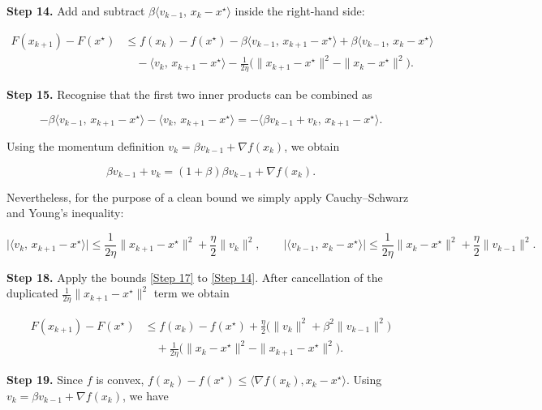 \documentclass{article}
\newcommand{\grad}{\nabla}
\begin{document}
\medskip
\noindent\textbf{Step 14.}  Add and subtract $\beta\langle v_{k-1},\,x_{k}-x^{\star}\rangle$ inside the right‑hand side:

\[
\begin{aligned}
F(x_{k+1})-F(x^{\star})
&\le f(x_{k})-f(x^{\star})
   -\beta\langle v_{k-1},\,x_{k+1}-x^{\star}\rangle
   +\beta\langle v_{k-1},\,x_{k}-x^{\star}\rangle \\
&\quad -\langle v_{k},\,x_{k+1}-x^{\star}\rangle
   -\frac{1}{2\eta}\big(\|x_{k+1}-x^{\star}\|^{2}
                     -\|x_{k}-x^{\star}\|^{2}\big).
\end{aligned}
\tag{Step 14}
\]

\medskip
\noindent\textbf{Step 15.}  Recognise that the first two inner products can be combined as  

\[
-\beta\langle v_{k-1},\,x_{k+1}-x^{\star}\rangle
   -\langle v_{k},\,x_{k+1}-x^{\star}\rangle
= -\langle \beta v_{k-1}+v_{k},\,x_{k+1}-x^{\star}\rangle .
\tag{Step 15}
\]

Using the momentum definition $v_{k}= \beta v_{k-1}+ \grad f(x_{k})$, we obtain  

\[
\beta v_{k-1}+v_{k}= (1+\beta)\beta v_{k-1}+ \grad f(x_{k}).
\tag{Step 16}
\]

Nevertheless, for the purpose of a clean bound we simply apply Cauchy–Schwarz and Young’s inequality:

\[
\big|\langle v_{k},\,x_{k+1}-x^{\star}\rangle\big|
\le \frac{1}{2\eta}\|x_{k+1}-x^{\star}\|^{2}
     +\frac{\eta}{2}\|v_{k}\|^{2},
\qquad
\big|\langle v_{k-1},\,x_{k}-x^{\star}\rangle\big|
\le \frac{1}{2\eta}\|x_{k}-x^{\star}\|^{2}
     +\frac{\eta}{2}\|v_{k-1}\|^{2}.
\tag{Step 17}
\]

\medskip
\noindent\textbf{Step 18.}  Apply the bounds \eqref{Step 17} to \eqref{Step 14}.  After cancellation of the duplicated $\frac{1}{2\eta}\|x_{k+1}-x^{\star}\|^{2}$ term we obtain

\[
\begin{aligned}
F(x_{k+1})-F(x^{\star})
&\le f(x_{k})-f(x^{\star})
   +\frac{\eta}{2}\big(\|v_{k}\|^{2}+ \beta^{2}\|v_{k-1}\|^{2}\big) \\
&\quad +\frac{1}{2\eta}\big(\|x_{k}-x^{\star}\|^{2}
                         -\|x_{k+1}-x^{\star}\|^{2}\big).
\end{aligned}
\tag{Step 18}
\]

\medskip
\noindent\textbf{Step 19.}  Since $f$ is convex, $f(x_{k})-f(x^{\star})\le\langle\grad f(x_{k}),x_{k}-x^{\star}\rangle$.  Using $v_{k}= \beta v_{k-1}+ \grad f(x_{k})$, we have  
\end{document}
